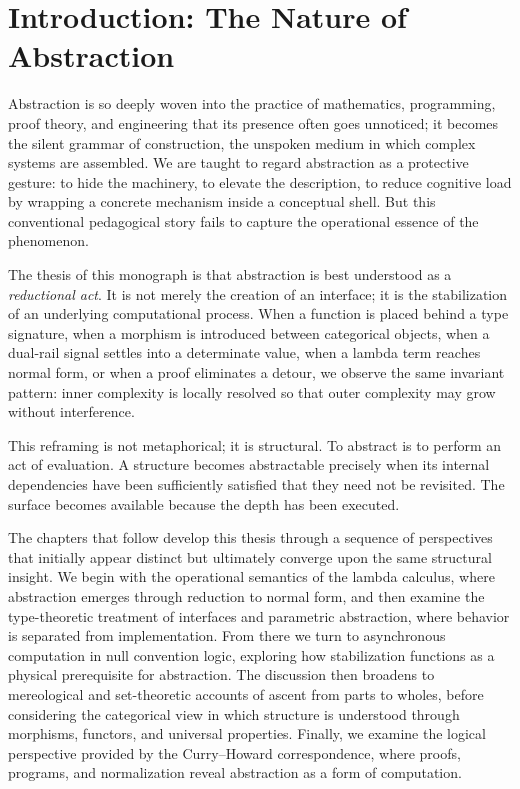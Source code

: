 \documentclass[12pt,letterpaper]{article}
\theoremstyle{remark}
\begin{document}
\section{Introduction: The Nature of Abstraction}

Abstraction is so deeply woven into the practice of mathematics, programming, proof theory, and engineering that its presence often goes unnoticed; it becomes the silent grammar of construction, the unspoken medium in which complex systems are assembled. We are taught to regard abstraction as a protective gesture: to hide the machinery, to elevate the description, to reduce cognitive load by wrapping a concrete mechanism inside a conceptual shell. But this conventional pedagogical story fails to capture the operational essence of the phenomenon.

The thesis of this monograph is that abstraction is best understood as a \emph{reductional act}. It is not merely the creation of an interface; it is the stabilization of an underlying computational process. When a function is placed behind a type signature, when a morphism is introduced between categorical objects, when a dual-rail signal settles into a determinate value, when a lambda term reaches normal form, or when a proof eliminates a detour, we observe the same invariant pattern: inner complexity is locally resolved so that outer complexity may grow without interference.

This reframing is not metaphorical; it is structural. To abstract is to perform an act of evaluation. A structure becomes abstractable precisely when its internal dependencies have been sufficiently satisfied that they need not be revisited. The surface becomes available because the depth has been executed.

The chapters that follow develop this thesis through a sequence of perspectives that initially appear distinct but ultimately converge upon the same structural insight. We begin with the operational semantics of the lambda calculus, where abstraction emerges through reduction to normal form, and then examine the type-theoretic treatment of interfaces and parametric abstraction, where behavior is separated from implementation. From there we turn to asynchronous computation in null convention logic, exploring how stabilization functions as a physical prerequisite for abstraction. The discussion then broadens to mereological and set-theoretic accounts of ascent from parts to wholes, before considering the categorical view in which structure is understood through morphisms, functors, and universal properties. Finally, we examine the logical perspective provided by the Curry--Howard correspondence, where proofs, programs, and normalization reveal abstraction as a form of computation.
\end{document}
